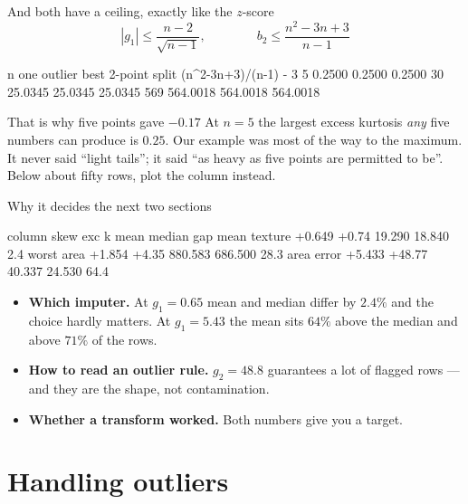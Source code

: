\documentclass[aspectratio=169]{beamer}
\begin{document}
\begin{frame}[fragile,shrink=6]{And both have a ceiling, exactly like the $z$-score}
\[
  |g_1| \le \frac{n-2}{\sqrt{n-1}},
  \qquad\qquad
  b_2 \le \frac{n^2 - 3n + 3}{n-1}
\]
\begin{outblk}
     n    one outlier   best 2-point split   (n^2-3n+3)/(n-1) - 3
     5         0.2500               0.2500                 0.2500
    30        25.0345              25.0345                25.0345
   569       564.0018             564.0018               564.0018
\end{outblk}
\begin{alertblock}{That is why five points gave $-0.17$}
  \footnotesize At $n=5$ the largest excess kurtosis \emph{any} five numbers
  can produce is $\mathbf{0.25}$. Our example was most of the way to the
  maximum. It never said ``light tails''; it said ``as heavy as five points are
  permitted to be''. Below about fifty rows, plot the column instead.
\end{alertblock}
\end{frame}

\begin{frame}[fragile,shrink=6]{Why it decides the next two sections}
\begin{outblk}
column            skew     exc k       mean     median     gap %
mean texture    +0.649     +0.74     19.290     18.840      2.4%
worst area      +1.854     +4.35    880.583    686.500     28.3%
area error      +5.433    +48.77     40.337     24.530     64.4%
\end{outblk}
\vspace{0.2em}
\begin{itemize}\small
  \item \textbf{Which imputer.} At $g_1=0.65$ mean and median differ by
    $2.4\%$ and the choice hardly matters. At $g_1=5.43$ the mean sits
    $64\%$ above the median and above $71\%$ of the rows.
  \item \textbf{How to read an outlier rule.} $g_2 = 48.8$ guarantees a lot of
    flagged rows --- and they are the shape, not contamination.
  \item \textbf{Whether a transform worked.} Both numbers give you a target.
\end{itemize}
\end{frame}

\section[Outliers]{Handling outliers}
\label{sec:outliers}
\end{document}
